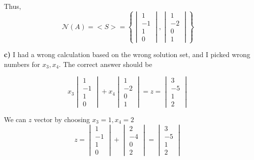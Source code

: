\documentclass{article}
\begin{document}
Thus,
\[
\mathcal{N}(A) = <S>=
\left\{
  \begin{vmatrix}
    1 \\
    -1 \\
    1 \\
    0
  \end{vmatrix}
  ,
  \begin{vmatrix}
    1 \\
    -2 \\
    0 \\
    1
  \end{vmatrix}
\right\}
\]

\noindent\textbf{c)} I had a wrong calculation based on the wrong solution set, and I picked wrong numbers for \(x_3, x_4\).
The correct answer should be

\[
  x_3
  \begin{vmatrix}
    1 \\
    -1 \\
    1 \\
    0
  \end{vmatrix}
  +
  x_4
  \begin{vmatrix}
    1 \\
    -2 \\
    0 \\
    1
  \end{vmatrix}
  =z=
  \begin{vmatrix}
    3 \\
    -5 \\
    1 \\
    2
  \end{vmatrix}
\]

We can \(z\) vector by choosing \(x_3=1, x_4=2\)
\[
z=
  \begin{vmatrix}
    1 \\
    -1 \\
    1 \\
    0
  \end{vmatrix}
  +
  \begin{vmatrix}
    2 \\
    -4 \\
    0 \\
    2
  \end{vmatrix}
=
  \begin{vmatrix}
    3 \\
    -5 \\
    1 \\
    2
  \end{vmatrix}
\]
\end{document}

